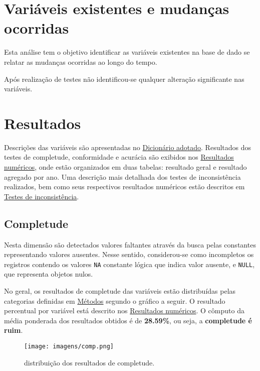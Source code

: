 \documentclass[
  12,
  table]{proadi}
\begin{document}
\hypertarget{variuxe1veis-existentes-e-mudanuxe7as-ocorridas}{%
\section{Variáveis existentes e mudanças
ocorridas}\label{variuxe1veis-existentes-e-mudanuxe7as-ocorridas}}

Esta análise tem o objetivo identificar as variáveis existentes na base
de dado se relatar as mudanças ocorridas ao longo do tempo.

Após realização de testes não identificou-se qualquer alteração
significante nas variáveis.

\hypertarget{resultados}{%
\section{Resultados}\label{resultados}}

Descrições das variáveis são apresentadas no
\protect\hyperlink{dicionuxe1rio-adotado}{Dicionário adotado}.
Resultados dos testes de completude, conformidade e acurácia são
exibidos nos \protect\hyperlink{resultados-numuxe9ricos}{Resultados
numéricos}, onde estão organizados em duas tabelas: resultado geral e
resultado agregado por ano. Uma descrição mais detalhada dos testes de
inconsistência realizados, bem como seus respectivos resultados
numéricos estão descritos em
\protect\hyperlink{testes-de-inconsistuxeancia}{Testes de
inconsistência}.

\hypertarget{completude}{%
\subsection{Completude}\label{completude}}

Nesta dimensão são detectados valores faltantes através da busca pelas
constantes representando valores ausentes. Nesse sentido, considerou-se
como incompletos os registros contendo os valores \texttt{NA} constante
lógica que indica valor ausente, e \texttt{NULL}, que representa objetos
nulos.

No geral, os resultados de completude das variáveis estão distribuídas
pelas categorias definidas em \protect\hyperlink{muxe9todos}{Métodos}
segundo o gráfico a seguir. O resultado percentual por variável está
descrito nos \protect\hyperlink{resultados-numuxe9ricos}{Resultados
numéricos}. O cômputo da média ponderada dos resultados obtidos é de
\textbf{28.59\%}, ou seja, a \textbf{completude é ruim}.

\begin{figure}
\centering
\texttt{[image: imagens/comp.png]}
\caption{distribuição dos resultados de completude.}
\end{figure}
\end{document}
